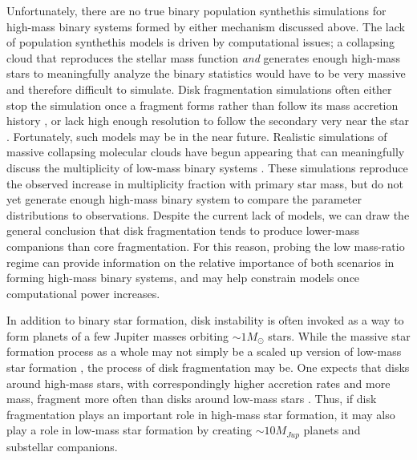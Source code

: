 Unfortunately, there are no true binary population synthethis
simulations for high-mass binary systems formed by either mechanism
discussed above. The lack of population synthethis models is driven
by computational issues; a collapsing
cloud that reproduces the stellar mass function \emph{and} generates
enough high-mass stars to meaningfully analyze the binary statistics
would have to be very massive and therefore difficult to
simulate. Disk fragmentation simulations often either stop the
simulation once a fragment forms rather than follow its mass accretion
history \citep[e.g.][]{Boss2011, Krumholz2007}, or lack high enough resolution to follow the secondary very
near the star \citep[e.g.][]{BonnellBate2005}. Fortunately, such models may be in the near future. Realistic simulations of massive collapsing molecular clouds have begun appearing that can meaningfully discuss the multiplicity of low-mass binary systems
\citep{Bate2012, Krumholz2012}. These simulations reproduce the observed increase in multiplicity fraction with primary star mass, but do not yet generate enough high-mass binary system to compare the parameter distributions to observations. Despite the current lack of models, we can draw the general conclusion that disk
fragmentation tends to produce lower-mass companions than core
fragmentation. For this reason, probing the low mass-ratio regime can
provide information on the relative importance of both scenarios in
forming high-mass binary systems, and may help constrain models once
computational power increases.

In addition to binary star formation, disk instability is often invoked as a way
to form planets of a few Jupiter masses orbiting $\sim 1 M_{\odot}$ stars.
While the massive star formation process as a
whole may not simply be a scaled up version of low-mass star
formation \citep{Zinnecker2007}, the process of disk fragmentation may
be. One expects that disks around high-mass stars, with correspondingly higher accretion rates
and more mass, fragment more often than disks around low-mass stars \citep{Boss2011, Boss2006,
  Sally2009, Kratter2006}. Thus, if disk fragmentation plays an important role
in high-mass star formation, it may also play a role in low-mass star
formation by creating $\sim 10M_{Jup}$ planets and substellar companions.



